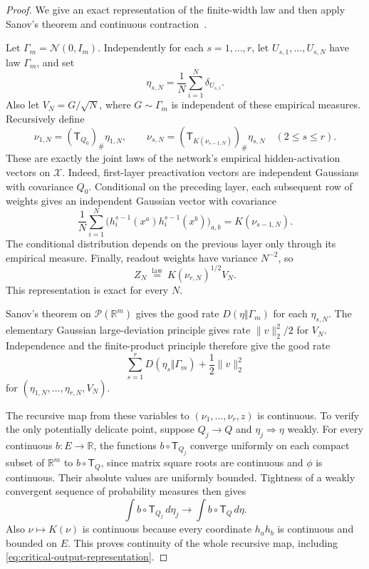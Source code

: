 \begin{proof}
We give an exact representation of the finite-width law and then apply
Sanov's theorem and continuous contraction~\cite{dembozeitouni}.

Let $\Gamma_m=\mathcal N(0,I_m)$. Independently for each
$s=1,\ldots,r$, let $U_{s,1},\ldots,U_{s,N}$ have law $\Gamma_m$, and set
\[
 \eta_{s,N}=\frac1N\sum_{i=1}^N\delta_{U_{s,i}}.
\]
Also let $V_N=G/\sqrt N$, where $G\sim\Gamma_m$ is independent of these
empirical measures. Recursively define
\[
 \nu_{1,N}=(\mathsf T_{Q_0})_\#\eta_{1,N},\qquad
 \nu_{s,N}=(\mathsf T_{K(\nu_{s-1,N})})_\#\eta_{s,N}\quad(2\leq s\leq r).
\]
These are exactly the joint laws of the network's empirical hidden-activation
vectors on $\mathcal X$. Indeed, first-layer preactivation vectors are
independent Gaussians with covariance $Q_0$. Conditional on the preceding
layer, each subsequent row of weights gives an independent Gaussian vector
with covariance
\[
 \frac1N\sum_{i=1}^N
 \bigl(h_i^{s-1}(x^a)h_i^{s-1}(x^b)\bigr)_{a,b}
 =K(\nu_{s-1,N}).
\]
The conditional distribution depends on the previous layer only through its
empirical measure. Finally, readout weights have variance $N^{-2}$, so
\begin{equation}\label{eq:critical-output-representation}
 Z_N\ \stackrel{\mathrm{law}}{=}\ K(\nu_{r,N})^{1/2}V_N.
\end{equation}
This representation is exact for every $N$.

Sanov's theorem on $\mathcal P(\mathbb R^m)$ gives the good rate
$D(\eta\Vert\Gamma_m)$ for each $\eta_{s,N}$. The elementary Gaussian
large-deviation principle gives rate $\|v\|_2^2/2$ for $V_N$.
Independence and the finite-product principle therefore give the good rate
\[
 \sum_{s=1}^r D(\eta_s\Vert\Gamma_m)+\frac12\|v\|_2^2
\]
for $(\eta_{1,N},\ldots,\eta_{r,N},V_N)$.

The recursive map from these variables to $(\nu_1,\ldots,\nu_r,z)$ is
continuous. To verify the only potentially delicate point, suppose
$Q_j\to Q$ and $\eta_j\Rightarrow\eta$ weakly. For every continuous
$b:E\to\mathbb R$, the functions $b\circ\mathsf T_{Q_j}$ converge
uniformly on each compact subset of $\mathbb R^m$ to
$b\circ\mathsf T_Q$, since matrix square roots are continuous and $\phi$
is continuous. Their absolute values are uniformly bounded. Tightness of a
weakly convergent sequence of probability measures then gives
\[
 \int b\circ\mathsf T_{Q_j}\,d\eta_j
 \longrightarrow\int b\circ\mathsf T_Q\,d\eta.
\]
Also $\nu\mapsto K(\nu)$ is continuous because every coordinate
$h_ah_b$ is continuous and bounded on $E$. This proves continuity of the
whole recursive map, including \eqref{eq:critical-output-representation}.


\end{proof}
